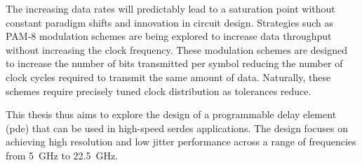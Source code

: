 The increasing data rates will predictably lead to a saturation point without constant paradigm shifts and innovation in circuit design. Strategies such as PAM-8 modulation schemes are being explored to increase data throughput without increasing the clock frequency. These modulation schemes are designed to increase the number of bits transmitted per symbol reducing the number of clock cycles required to transmit the same amount of data. Naturally, these schemes require precisely tuned clock distribution as tolerances reduce.

This thesis thus aims to explore the design of a programmable delay element (\gls{pde}) that can be used in high-speed \gls{serdes} applications. The design focuses on achieving high resolution and low jitter performance across a range of frequencies from 5~GHz to 22.5~GHz.
